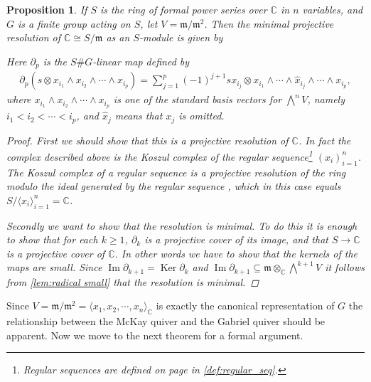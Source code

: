 \documentclass[11pt, a4paper, english]{article}
\newtheorem{prop}[theorem]{Proposition}
\theoremstyle{definition}
\newcommand{\C}{\mathbb{C}}
\DeclareMathOperator{\Image}{Im}
\DeclareMathOperator{\Ker}{Ker}
\begin{document}
\begin{prop}
If $S$ is the ring of formal power series over $\C$ in $n$ variables, and $G$ is a finite group acting on $S$, let $V=\mathfrak{m}/\mathfrak{m}^2$. Then the minimal projective resolution of $\C \cong S/\mathfrak{m}$ as an $S$-module is given by
\begin{center}
\end{center}
Here $\partial_p$ is the $S\#G$-linear map defined by
\begin{align*}
\partial_p(s \otimes x_{i_1} \wedge x_{i_2} \wedge \cdots \wedge x_{i_p}) = \sum_{j=1}^{p} (-1)^{j+1} sx_{i_j} \otimes x_{i_1} \wedge \cdots \wedge \hat{x}_{i_{j}} \wedge \cdots \wedge x_{i_{p}},
\end{align*}
where $x_{i_1} \wedge x_{i_2} \wedge \cdots \wedge x_{i_p}$ is one of the standard basis vectors for $\bigwedge\limits^n V$, namely $i_1 < i_2 < \cdots < i_p$, and  $\hat{x}_j$ means that $x_j$ is omitted.

\begin{proof}
First we should show that this is a projective resolution of $\C$. In fact the complex described above is the Koszul complex of the regular sequence\footnote{Regular sequences are defined on page \pageref{def:regular_seq} in \cref{def:regular_seq}.} $(x_i)_{i=1}^n$. The Koszul complex of a regular sequence is a projective resolution of the ring modulo the ideal generated by the regular sequence \cite[\href{https://stacks.math.columbia.edu/tag/062F}{Tag 062F}]{stacks-project}, which in this case equals $S/\langle x_i \rangle_{i=1}^n = \C$.

Secondly we want to show that the resolution is minimal. To do this it is enough to show that for each $k \geq 1$, $\partial_k$ is a projective cover of its image, and that $S \to \C$ is a projective cover of $\C$. In other words we have to show that the kernels of the maps are small. Since $\Image \partial_{k+1} = \Ker \partial_k$ and $\Image \partial_{k+1} \subseteq \mathfrak{m} \otimes_\C \bigwedge\limits^{k+1}V$ it follows from \cref{lem:radical small} that the resolution is minimal.
\end{proof}
\end{prop}

Since $V = \mathfrak{m}/\mathfrak{m}^2 = \langle x_1, x_2, \cdots, x_n \rangle_\C$ is exactly the canonical representation of $G$ the relationship between the McKay quiver and the Gabriel quiver should be apparent. Now we move to the next theorem for a formal argument.
\end{document}
